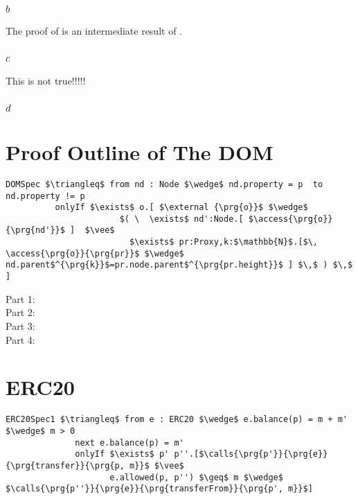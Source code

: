 \documentclass[acmsmall,review,anonymous]{acmart}\settopmatter{printfolios=true,printccs=false,printacmref=false}
\begin{document}
\subsection{$_b$}
The proof of  is an intermediate result of .

\subsection{$_c$}
This is not true!!!!!

\subsection{$_d$}


\section{Proof Outline of The DOM}

\begin{lstlisting}[language = Chainmail, mathescape=true, frame=lines]
DOMSpec $\triangleq$ from nd : Node $\wedge$ nd.property = p  to nd.property != p
          onlyIf $\exists$ o.[ $\external {\prg{o}}$ $\wedge$ 
                       $( \  \exists$ nd':Node.[ $\access{\prg{o}}{\prg{nd'}}$ ]  $\vee$ 
                         $\exists$ pr:Proxy,k:$\mathbb{N}$.[$\, \access{\prg{o}}{\prg{pr}}$ $\wedge$ nd.parent$^{\prg{k}}$=pr.node.parent$^{\prg{pr.height}}$ ] $\,$ ) $\,$ ]
\end{lstlisting}

\begin{description}
\item[Part 1:]

\item[Part 2:]
\item[Part 3:]
\item[Part 4:]
\end{description}

\section{ERC20}
\begin{lstlisting}[language = Chainmail, mathescape=true, frame=lines]
ERC20Spec1 $\triangleq$ from e : ERC20 $\wedge$ e.balance(p) = m + m' $\wedge$ m > 0
              next e.balance(p) = m'
              onlyIf $\exists$ p' p''.[$\calls{\prg{p'}}{\prg{e}}{\prg{transfer}}{\prg{p, m}}$ $\vee$ 
                     e.allowed(p, p'') $\geq$ m $\wedge$ $\calls{\prg{p''}}{\prg{e}}{\prg{transferFrom}}{\prg{p', m}}$]
\end{lstlisting}
\end{document}
